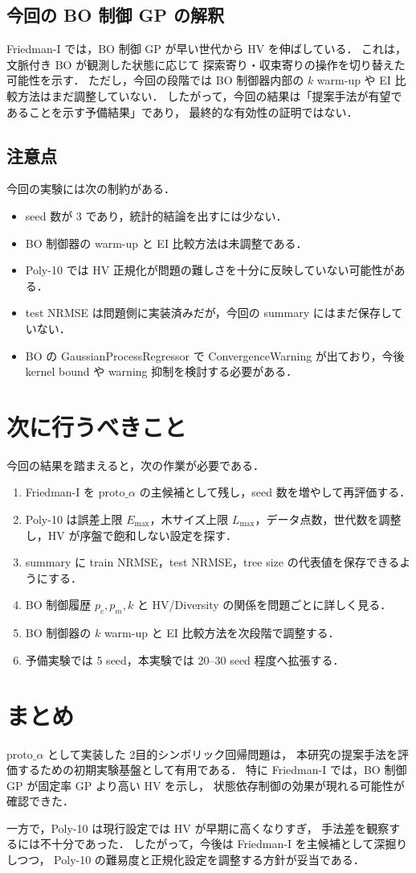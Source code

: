 \documentclass[a4paper,11pt]{ltjsarticle}
\begin{document}
\subsection{今回の BO 制御 GP の解釈}

Friedman-I では，BO 制御 GP が早い世代から HV を伸ばしている．
これは，文脈付き BO が観測した状態に応じて
探索寄り・収束寄りの操作を切り替えた可能性を示す．
ただし，今回の段階では BO 制御器内部の \(k\) warm-up や EI 比較方法はまだ調整していない．
したがって，今回の結果は「提案手法が有望であることを示す予備結果」であり，
最終的な有効性の証明ではない．

\subsection{注意点}

今回の実験には次の制約がある．

\begin{itemize}
  \item seed 数が 3 であり，統計的結論を出すには少ない．
  \item BO 制御器の warm-up と EI 比較方法は未調整である．
  \item Poly-10 では HV 正規化が問題の難しさを十分に反映していない可能性がある．
  \item test NRMSE は問題側に実装済みだが，今回の summary にはまだ保存していない．
  \item BO の GaussianProcessRegressor で ConvergenceWarning が出ており，今後 kernel bound や warning 抑制を検討する必要がある．
\end{itemize}

\section{次に行うべきこと}

今回の結果を踏まえると，次の作業が必要である．

\begin{enumerate}
  \item Friedman-I を \(\mathrm{proto}\_\alpha\) の主候補として残し，seed 数を増やして再評価する．
  \item Poly-10 は誤差上限 \(E_{\max}\)，木サイズ上限 \(L_{\max}\)，データ点数，世代数を調整し，HV が序盤で飽和しない設定を探す．
  \item summary に train NRMSE，test NRMSE，tree size の代表値を保存できるようにする．
  \item BO 制御履歴 \(p_c,p_m,k\) と HV/Diversity の関係を問題ごとに詳しく見る．
  \item BO 制御器の \(k\) warm-up と EI 比較方法を次段階で調整する．
  \item 予備実験では 5 seed，本実験では 20--30 seed 程度へ拡張する．
\end{enumerate}

\section{まとめ}

\(\mathrm{proto}\_\alpha\) として実装した 2目的シンボリック回帰問題は，
本研究の提案手法を評価するための初期実験基盤として有用である．
特に Friedman-I では，BO 制御 GP が固定率 GP より高い HV を示し，
状態依存制御の効果が現れる可能性が確認できた．

一方で，Poly-10 は現行設定では HV が早期に高くなりすぎ，
手法差を観察するには不十分であった．
したがって，今後は Friedman-I を主候補として深掘りしつつ，
Poly-10 の難易度と正規化設定を調整する方針が妥当である．
\end{document}
